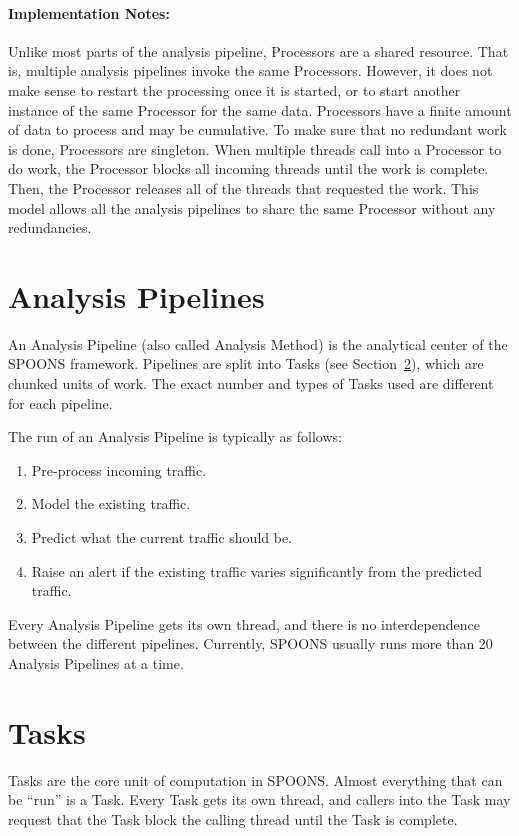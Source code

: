 \documentclass[12pt]{ucthesis}
\begin{document}
\paragraph{Implementation Notes:}
Unlike most parts of the analysis pipeline, Processors are a shared resource. That is, multiple analysis pipelines
invoke the same Processors. However, it does not make sense to restart the processing once it is started, or to
start another instance of the same Processor for the same data. Processors have a finite amount of data to process and may be cumulative.
To make sure that no redundant work is done, Processors are singleton. When multiple threads call into a Processor to do work, the Processor blocks
all incoming threads until the work is complete. Then, the Processor releases all of the threads that requested the work.
This model allows all the analysis pipelines to share the same Processor without any redundancies.

\section{Analysis Pipelines}
\label{arch-pipelines}
An Analysis Pipeline (also called Analysis Method) is the analytical center of the SPOONS framework.
Pipelines are split into Tasks (see Section~\ref{arch-tasks}), which are chunked units of work.
The exact number and types of Tasks used are different for each pipeline.

The run of an Analysis Pipeline is typically as follows:
\begin{enumerate}
   \item Pre-process incoming traffic.
   \item Model the existing traffic.
   \item Predict what the current traffic should be.
   \item Raise an alert if the existing traffic varies significantly from the predicted traffic.
\end{enumerate}

Every Analysis Pipeline gets its own thread, and there is no interdependence between the different pipelines.
Currently, SPOONS usually runs more than 20 Analysis Pipelines at a time.

\section{Tasks}
\label{arch-tasks}
Tasks are the core unit of computation in SPOONS. Almost everything that can be ``run'' is a Task.
Every Task gets its own thread, and callers into the Task may request that the Task block the calling thread
until the Task is complete.
\end{document}
